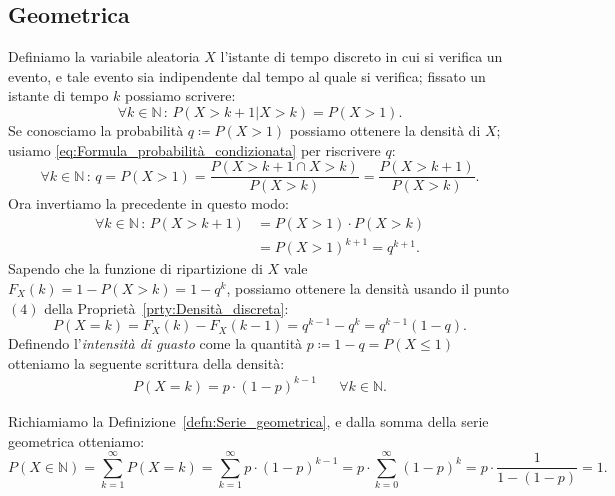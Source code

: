         \subsection{Geometrica}
            \begin{defn}
                Definiamo la variabile aleatoria $X$ l'istante di tempo discreto in cui si verifica un evento, e tale evento sia indipendente dal tempo al quale si verifica; fissato un istante di tempo $k$ possiamo scrivere: \[
                    \forall k \in \mathbb{N} \,:\, P(X > k + 1 | X > k) = P(X > 1)
                .\] Se conosciamo la probabilità $q \coloneqq P(X > 1)$ possiamo ottenere la densità di $X$; usiamo \eqref{eq:Formula_probabilità_condizionata} per riscrivere $q$: \[
                    \forall k \in \mathbb{N} \,:\, q = P(X > 1) = \frac{P(X > k + 1 \cap X > k)}{P(X > k)} = \frac{P(X > k + 1)}{P(X > k)}
                .\] Ora invertiamo la precedente in questo modo:
                \begin{align*}
                    \forall k \in \mathbb{N} \,:\, P(X > k + 1) &= P(X > 1) \cdot P(X > k) \\
                                                        &= P(X > 1)^{k+1} = q^{k+1}
                .\end{align*}
                Sapendo che la funzione di ripartizione di $X$ vale $F_X(k) = 1 - P(X > k) = 1 - q^k$, possiamo ottenere la densità usando il punto $(4)$ della Proprietà~\ref{prty:Densità_discreta}: \[
                    P(X = k) = F_X(k) - F_X(k-1) = q^{k-1} - q^k = q^{k-1}(1-q)
                .\] Definendo l'\emph{intensità di guasto} come la quantità $p \coloneqq 1-q = P(X \leq 1)$ otteniamo la seguente scrittura della densità:
                \begin{align*}
                    P(X = k) = p \cdot (1-p)^{k-1} & &\forall k \in \mathbb{N}
                .\end{align*}
            \end{defn}
            \begin{obsv}
                Richiamiamo la Definizione~\ref{defn:Serie_geometrica}, e dalla somma della serie geometrica otteniamo: \[
                    P(X \in \mathbb{N}) = \sum_{k=1}^{\infty} P(X = k) = \sum_{k=1}^{\infty} p \cdot (1-p)^{k-1} = p \cdot \sum_{k=0}^{\infty} (1-p)^k = p \cdot \frac{1}{1-(1-p)} = 1
                .\] 
            \end{obsv}
